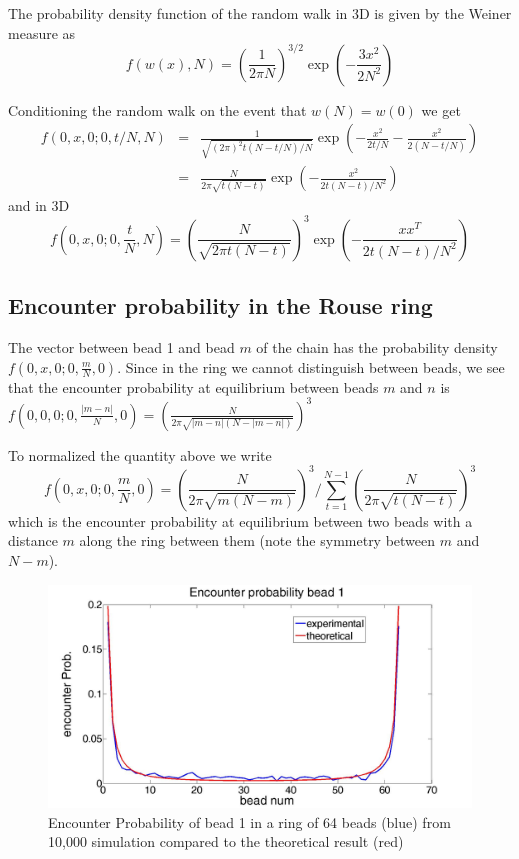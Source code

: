 \documentclass{report}
\begin{document}
The probability density function of the random walk in 3D is given by the Weiner measure as  
\begin{equation*}
f(w(x),N)=\left( \frac{1}{2\pi N}\right)^{3/2}\exp(-\frac{3x^2}{2N^2})
\end{equation*}

Conditioning the random walk on the event that $w(N)=w(0)$ we get 
\begin{eqnarray*}
f(0,x,0;0,t/N,N)&=&\frac{1}{\sqrt{(2\pi)^2 t(N-t/N)/N}}\exp(-\frac{x^2}{2t/N}-\frac{x^2}{2(N-t/N)})\\
&=&\frac{N}{2\pi\sqrt{t(N-t)}} \exp(-\frac{x^2}{2t(N-t)/N^2})
\end{eqnarray*}
and in 3D
\begin{equation*}
f(0,x,0;0,\frac{t}{N},N) = \left(\frac{N}{\sqrt{2\pi t(N-t)}}\right)^3 \exp\left(-\frac{xx^T}{2t(N-t)/N^2}\right)
\end{equation*}

\subsection{Encounter probability in the Rouse ring}\label{subsection_encounterProbabilityInTheRing}
The vector between bead 1 and bead $m$ of the chain has the probability density 
$f(0,x,0;0,\frac{m}{N},0)$. Since in the ring we cannot distinguish between beads, we see that the encounter probability at equilibrium between beads $m$ and $n$ is 
$f(0,0,0;0,\frac{|m-n|}{N},0)=\left(\frac{N}{2\pi \sqrt{|m-n|(N-|m-n|)}}\right)^3$

To normalized the quantity above we write 
\begin{equation*}
f(0,x,0;0,\frac{m}{N},0)=\left(\frac{N}{2\pi\sqrt{m(N-m)}}\right)^3 /\sum_{t=1}^{N-1}\left(\frac{N}{2\pi\sqrt{t(N-t)}}\right)^3 
\end{equation*}
which is the encounter probability at equilibrium between two beads with a distance $m$ along the ring between them (note the symmetry between $m$ and $N-m$). 

\begin{figure}[h!]
\includegraphics[scale=0.2]{encounterProbBead1InLoopOf64BeadsSimpleRouse}\caption{Encounter Probability of bead 1 in a ring of 64 beads (blue) from 10,000 simulation compared to the theoretical result (red)}\label{figure_rouseRingEncounterProbabilityComparisionToTheory}
\end{figure}
\end{document}
